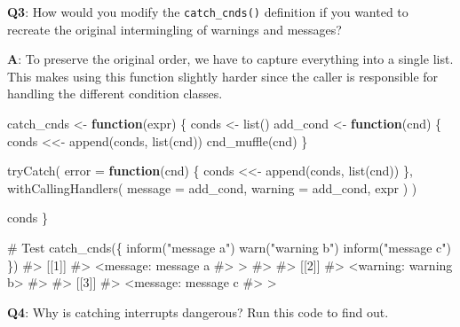 \documentclass[
]{krantz}
\makeatletter
\newenvironment{Shaded}{\begin{snugshade}}{\end{snugshade}}
\newcommand{\CommentTok}[1]{\textcolor[rgb]{0.56,0.35,0.01}{\textit{#1}}}
\newcommand{\ControlFlowTok}[1]{\textcolor[rgb]{0.13,0.29,0.53}{\textbf{#1}}}
\newcommand{\DataTypeTok}[1]{\textcolor[rgb]{0.13,0.29,0.53}{#1}}
\newcommand{\KeywordTok}[1]{\textcolor[rgb]{0.13,0.29,0.53}{\textbf{#1}}}
\newcommand{\NormalTok}[1]{#1}
\newcommand{\StringTok}[1]{\textcolor[rgb]{0.31,0.60,0.02}{#1}}
\newenvironment{kframe}{%
\medskip{}
\setlength{\fboxsep}{.8em}
 \def\at@end@of@kframe{}%
 \ifinner\ifhmode%
  \def\at@end@of@kframe{\end{minipage}}%
  \begin{minipage}{\columnwidth}%
 \fi\fi%
 \def\FrameCommand##1{\hskip\@totalleftmargin \hskip-\fboxsep
 \colorbox{shadecolor}{##1}\hskip-\fboxsep
     \hskip-\linewidth \hskip-\@totalleftmargin \hskip\columnwidth}%
 \MakeFramed {\advance\hsize-\width
   \@totalleftmargin\z@ \linewidth\hsize
   \@setminipage}}%
 {\par\unskip\endMakeFramed%
 \at@end@of@kframe}
\renewenvironment{Shaded}{\begin{kframe}}{\end{kframe}}
\renewcommand{\KeywordTok} [1]{\textcolor[rgb]{0.00,0.44,0.13}{{#1}}}
\renewcommand{\DataTypeTok}[1]{\textcolor[rgb]{0.56,0.13,0.00}{{#1}}}
\renewcommand{\StringTok}  [1]{\textcolor[rgb]{0.25,0.44,0.63}{{#1}}}
\renewcommand{\CommentTok} [1]{\textcolor[rgb]{0.38,0.63,0.69}{{#1}}}
\renewcommand{\NormalTok}  [1]{{#1}}
\makeatother
\begin{document}
\textbf{{Q3}}: How would you modify the \texttt{catch\_cnds()} definition if you wanted to recreate the original intermingling of warnings and messages?

\textbf{{A}}: To preserve the original order, we have to capture everything into a single list. This makes using this function slightly harder since the caller is responsible for handling the different condition classes.

\begin{Shaded}
\begin{Highlighting}[]
\NormalTok{catch_cnds <-}\StringTok{ }\ControlFlowTok{function}\NormalTok{(expr) \{}
\NormalTok{  conds <-}\StringTok{ }\KeywordTok{list}\NormalTok{()}
\NormalTok{  add_cond <-}\StringTok{ }\ControlFlowTok{function}\NormalTok{(cnd) \{}
\NormalTok{    conds <<-}\StringTok{ }\KeywordTok{append}\NormalTok{(conds, }\KeywordTok{list}\NormalTok{(cnd))}
    \KeywordTok{cnd_muffle}\NormalTok{(cnd)}
\NormalTok{  \}}

  \KeywordTok{tryCatch}\NormalTok{(}
    \DataTypeTok{error =} \ControlFlowTok{function}\NormalTok{(cnd) \{}
\NormalTok{      conds <<-}\StringTok{ }\KeywordTok{append}\NormalTok{(conds, }\KeywordTok{list}\NormalTok{(cnd))}
\NormalTok{    \},}
    \KeywordTok{withCallingHandlers}\NormalTok{(}
      \DataTypeTok{message =}\NormalTok{ add_cond,}
      \DataTypeTok{warning =}\NormalTok{ add_cond,}
\NormalTok{      expr}
\NormalTok{    )}
\NormalTok{  )}

\NormalTok{  conds}
\NormalTok{\}}

\CommentTok{# Test}
\KeywordTok{catch_cnds}\NormalTok{(\{}
  \KeywordTok{inform}\NormalTok{(}\StringTok{"message a"}\NormalTok{)}
  \KeywordTok{warn}\NormalTok{(}\StringTok{"warning b"}\NormalTok{)}
  \KeywordTok{inform}\NormalTok{(}\StringTok{"message c"}\NormalTok{)}
\NormalTok{\})}
\CommentTok{#> [[1]]}
\CommentTok{#> <message: message a}
\CommentTok{#> >}
\CommentTok{#> }
\CommentTok{#> [[2]]}
\CommentTok{#> <warning: warning b>}
\CommentTok{#> }
\CommentTok{#> [[3]]}
\CommentTok{#> <message: message c}
\CommentTok{#> >}
\end{Highlighting}
\end{Shaded}

\textbf{{Q4}}: Why is catching interrupts dangerous? Run this code to find out.
\end{document}
